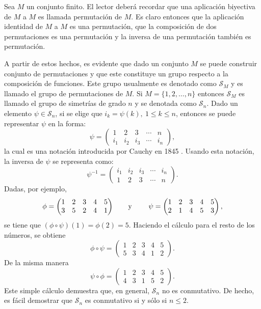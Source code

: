 \begin{ejemplo}\label{ejemplo:simetrias}
Sea $M$ un conjunto finito. El lector deberá recordar que una aplicación biyectiva de $M$ a $M$ es llamada permutación de $M$. Es claro entonces que la aplicación identidad de $M$ a $M$ es una permutación, que la composición de dos permutaciones es una permutación y la inversa de una permutación también es permutación. 

A partir de estos hechos, es evidente que dado un conjunto $M$ se puede construir conjunto de permutaciones y que este constituye un grupo respecto a la composición de funciones. Este grupo usualmente es denotado como $\mathcal{S}_M$ y es llamado el grupo de permutaciones de $M$. 
Si $M = \{  1,2,\dots, n \}$ entonces $\mathcal{S}_M$ es llamado el grupo de simetrías de grado $n$ y se denotada como $\mathcal{S}_n$. Dado un elemento $\psi \in \mathcal{S}_n$, si se elige que $i_k = \psi (k), \ 1 \leq k \leq n$, entonces se puede representar $\psi$ en la forma:
\[ \psi = \begin{pmatrix}
1 & 2 & 3 & \cdots & n \\
i_1 & i_2 & i_3 & \cdots & i_n
\end{pmatrix}, \]
la cual es una notación introducida por Cauchy en 1845 \cite[64-90]{bib:Cauchy}. Usando esta notación, la inversa de $\psi$ se representa como: \[ \psi^{-1} = \begin{pmatrix}
i_1 & i_2 & i_3 & \cdots & i_n \\
1 & 2 & 3 & \cdots & n
\end{pmatrix}.
 \]
 Dadas, por ejemplo, \[ \phi = \begin{pmatrix}
 1 & 2 & 3 & 4 & 5 \\
 3 & 5 & 2 & 4 & 1
 \end{pmatrix} \mbox{\qquad y \qquad } \psi = \begin{pmatrix}
 1 & 2 & 3 & 4 & 5 \\
  2 & 1 & 4 & 5 & 3
 \end{pmatrix}, \]
 se tiene que $(\phi \circ \psi)(1) = \phi(2) = 5$. Haciendo el cálculo para el resto de los números, se obtiene \[ \phi \circ \psi = \begin{pmatrix}
 1 & 2 & 3 & 4 & 5 \\
  5 & 3 & 4 & 1 & 2
 \end{pmatrix}. \]
 De la misma manera \[ \psi \circ \phi = \begin{pmatrix}
 1 & 2 & 3 & 4 & 5 \\
  4 & 3 & 1 & 5 & 2
 \end{pmatrix}. \]
\newpage Este simple cálculo demuestra que, en general, $\mathcal{S}_n$ no es conmutativo. De hecho, es fácil demostrar que $\mathcal{S}_n$ es conmutativo si y sólo si $n \leq 2$. 
\end{ejemplo}
